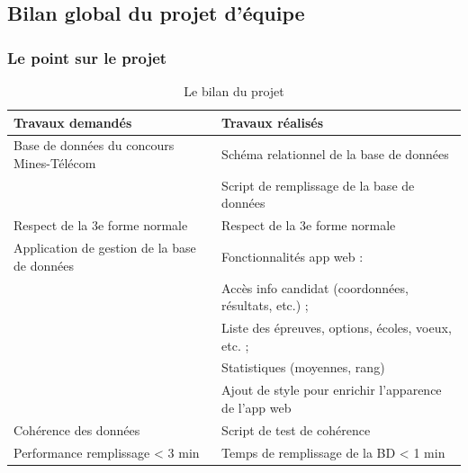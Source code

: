 \documentclass[12pt]{article}
\begin{document}
    \newpage
    
    \subsection*{Bilan global du projet d'équipe}
        
        \subsubsection*{Le point sur le projet}
        \begin{table}[!h]
            \centering
            \begin{tabular}{|l|l|}
                \hline
                Travaux demandés & Travaux réalisés \\
                \hline
                Base de données du concours Mines-Télécom & Schéma relationnel de la base de données \\
                 & Script de remplissage de la base de données \\
                Respect de la 3e forme normale & Respect de la 3e forme normale  \\
                Application de gestion de la base de données & Fonctionnalités app web : \\
                 & Accès info candidat (coordonnées, résultats, etc.) ; \\
                 & Liste des épreuves, options, écoles, voeux, etc. ; \\
                 & Statistiques (moyennes, rang) \\
                 & Ajout de style pour enrichir l'apparence de l'app web \\
                Cohérence des données & Script de test de cohérence \\
                Performance remplissage < 3 min & Temps de remplissage de la BD < 1 min \\
                \hline
            \end{tabular}
            \caption{Le bilan du projet}
            \label{tab:bilan}
        \end{table}
        
\end{document}

